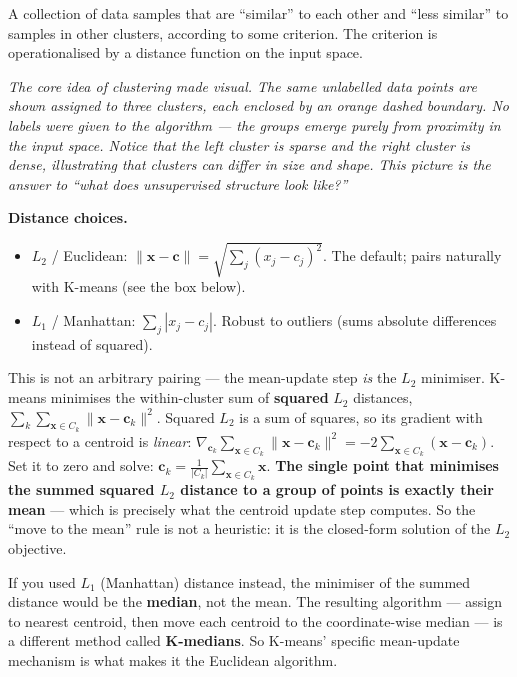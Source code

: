 \documentclass[11pt, a4paper]{article}
\begin{document}
\begin{defbox}[Cluster]
A collection of data samples that are ``similar'' to each other and ``less similar'' to samples in other clusters, according to some criterion. The criterion is operationalised by a distance function on the input space.
\end{defbox}

\begin{center}

\footnotesize\textit{The core idea of clustering made visual. The same unlabelled data points are shown assigned to three clusters, each enclosed by an orange dashed boundary. No labels were given to the algorithm --- the groups emerge purely from proximity in the input space. Notice that the left cluster is sparse and the right cluster is dense, illustrating that clusters can differ in size and shape. This picture is the answer to ``what does unsupervised structure look like?''}
\end{center}

\textbf{Distance choices.}
\begin{itemize}
  \item $L_2$ / Euclidean: $\|\mathbf{x}-\mathbf{c}\| = \sqrt{\sum_j(x_j - c_j)^2}$. The default; pairs naturally with K-means (see the box below).
  \item $L_1$ / Manhattan: $\sum_j|x_j - c_j|$. Robust to outliers (sums absolute differences instead of squared).
\end{itemize}

\begin{notebox}
This is not an arbitrary pairing --- the mean-update step \emph{is} the $L_2$ minimiser. K-means minimises the within-cluster sum of \textbf{squared} $L_2$ distances, $\sum_k\sum_{\mathbf{x}\in C_k}\|\mathbf{x}-\mathbf{c}_k\|^2$. Squared $L_2$ is a sum of squares, so its gradient with respect to a centroid is \emph{linear}: $\nabla_{\mathbf{c}_k}\sum_{\mathbf{x}\in C_k}\|\mathbf{x}-\mathbf{c}_k\|^2 = -2\sum_{\mathbf{x}\in C_k}(\mathbf{x}-\mathbf{c}_k)$. Set it to zero and solve: $\mathbf{c}_k = \frac{1}{|C_k|}\sum_{\mathbf{x}\in C_k}\mathbf{x}$. \textbf{The single point that minimises the summed squared $L_2$ distance to a group of points is exactly their mean} --- which is precisely what the centroid update step computes. So the ``move to the mean'' rule is not a heuristic: it is the closed-form solution of the $L_2$ objective.

If you used $L_1$ (Manhattan) distance instead, the minimiser of the summed distance would be the \textbf{median}, not the mean. The resulting algorithm --- assign to nearest centroid, then move each centroid to the coordinate-wise median --- is a different method called \textbf{K-medians}. So K-means' specific mean-update mechanism is what makes it the Euclidean algorithm.
\end{notebox}
\end{document}

